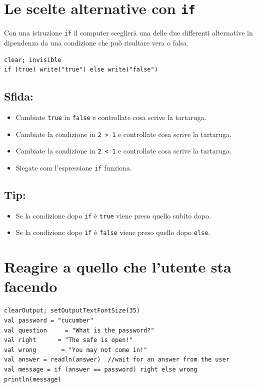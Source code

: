 \chapter{Le scelte alternative con \lstinline{if}}Con una istruzione \lstinline{if} il computer sceglierà una delle due differenti alternative in dipendenza da una condizione che può risultare vera o falsa.

\begin{lstlisting}[basicstyle={\ttfamily\fontsize{20}{24}\selectfont},numbers=none]
clear; invisible
if (true) write("true") else write("false")
\end{lstlisting}
        
\section*{\color{BrickRed}Sfida:}


\begin{itemize}

\item {Cambiate \lstinline{true} in \lstinline{false} e controllate cosa scrive la tartaruga.}
\item {Cambiate la condizione in \lstinline{2 > 1} e controllate cosa scrive la tartaruga.}
\item {Cambiate la condizione in \lstinline{2 < 1} e controllate cosa scrive la tartaruga.}
\item {Siegate com l'espressione \lstinline{if} funziona.}

\end{itemize}


\section*{\color{OliveGreen}Tip:}


\begin{itemize}

\item {Se la condizione dopo \lstinline{if} è \lstinline{true} viene preso quello subito dopo.}
\item {Se la condizione dopo \lstinline{if} è \lstinline{false} viene preso quello dopo \lstinline{else}.}

\end{itemize}


\chapter{Reagire a quello che l'utente sta facendo}
\begin{lstlisting}[basicstyle={\ttfamily\fontsize{20}{24}\selectfont},numbers=none]
clearOutput; setOutputTextFontSize(35)
val password = "cucumber"
val question     = "What is the password?"
val right      = "The safe is open!"
val wrong       = "You may not come in!"
val answer = readln(answer)  //wait for an answer from the user
val message = if (answer == password) right else wrong
println(message)
\end{lstlisting}
        
